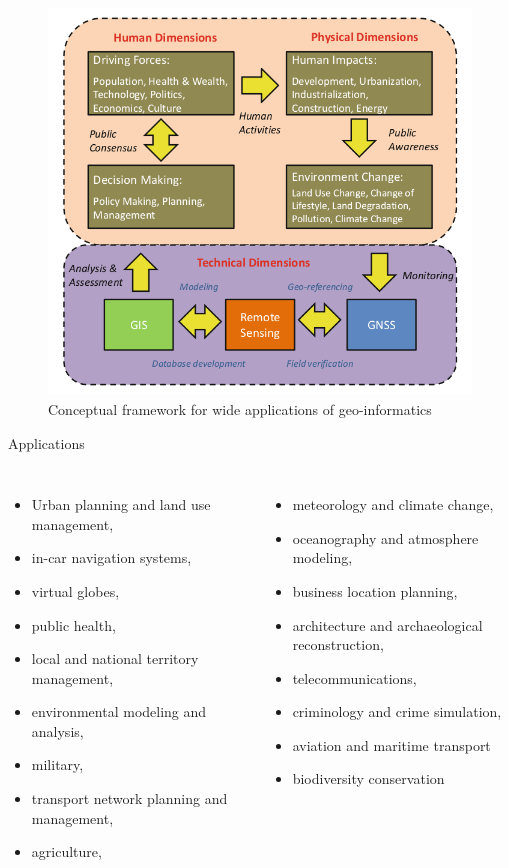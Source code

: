 \documentclass[11pt,dvipsnames,ignorenonframetext,aspectratio=169]{beamer}
\begin{document}
\begin{frame}{}
\protect\hypertarget{section-1}{}
\begin{figure}

{\centering \includegraphics[width=0.55\linewidth]{../images/framework_geoinformatics} 

}

\caption{Conceptual framework for wide applications of geo-informatics}\label{fig:conceptual-framework-geoinformatics}
\end{figure}
\end{frame}

\begin{frame}{Applications}
\protect\hypertarget{applications}{}
\begin{columns}[T, onlytextwidth]
\begin{itemize}
\small
\item Urban planning and land use management,
\item in-car navigation systems,
\item virtual globes,
\item public health,
\item local and national territory management,
\item environmental modeling and analysis,
\item military,
\item transport network planning and management,
\item agriculture,
\end{itemize}
\begin{itemize}
\small
\item meteorology and climate change,
\item oceanography and atmosphere modeling,
\item business location planning,
\item architecture and archaeological reconstruction,
\item telecommunications,
\item criminology and crime simulation,
\item aviation and maritime transport
\item biodiversity conservation
\end{itemize}
\end{columns}
\end{frame}
\end{document}
